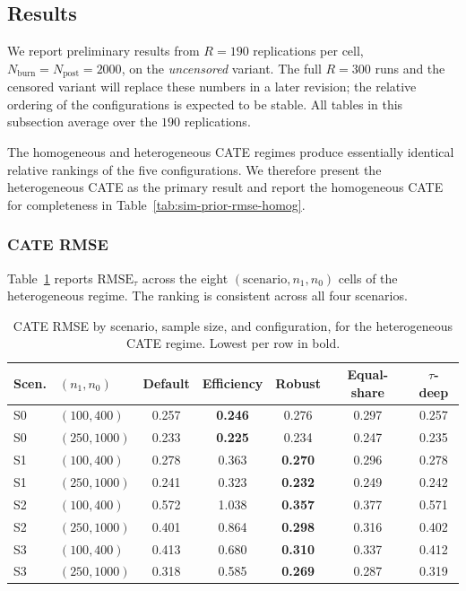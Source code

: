 \documentclass[11pt]{article}
\theoremstyle{plain}
\theoremstyle{definition}
\theoremstyle{remark}
\newcommand{\1}{\mathds{1}}
\begin{document}
\subsection{Results}
\label{sec:sim-prior-results}

We report preliminary results from $R = 190$ replications per cell,
$N_{\mathrm{burn}} = N_{\mathrm{post}} = 2000$, on the \emph{uncensored}
variant. The full $R = 300$ runs and the censored variant will replace
these numbers in a later revision; the relative ordering of the
configurations is expected to be stable. All tables in this subsection
average over the $190$ replications.

The homogeneous and heterogeneous CATE regimes produce essentially
identical relative rankings of the five configurations. We therefore
present the heterogeneous CATE as the primary result and report the
homogeneous CATE for completeness in
Table~\ref{tab:sim-prior-rmse-homog}.

\subsubsection*{CATE RMSE}

Table~\ref{tab:sim-prior-rmse-het} reports $\mathrm{RMSE}_\tau$ across the
eight $(\text{scenario}, n_1, n_0)$ cells of the heterogeneous regime. The
ranking is consistent across all four scenarios.

\begin{table}[tb]
\centering
\small
\caption{CATE RMSE by scenario, sample size, and configuration, for the
heterogeneous CATE regime. Lowest per row in bold.}
\label{tab:sim-prior-rmse-het}
\begin{tabular}{llccccc}
\toprule
Scen. & $(n_1, n_0)$  & Default & Efficiency      & Robust          & Equal-share     & $\tau$-deep \\
\midrule
S0    & $(100, 400)$  & 0.257   & \textbf{0.246}  & 0.276           & 0.297           & 0.257       \\
S0    & $(250, 1000)$ & 0.233   & \textbf{0.225}  & 0.234           & 0.247           & 0.235       \\
\midrule
S1    & $(100, 400)$  & 0.278   & 0.363           & \textbf{0.270}  & 0.296           & 0.278       \\
S1    & $(250, 1000)$ & 0.241   & 0.323           & \textbf{0.232}  & 0.249           & 0.242       \\
\midrule
S2    & $(100, 400)$  & 0.572   & 1.038           & \textbf{0.357}  & 0.377           & 0.571       \\
S2    & $(250, 1000)$ & 0.401   & 0.864           & \textbf{0.298}  & 0.316           & 0.402       \\
\midrule
S3    & $(100, 400)$  & 0.413   & 0.680           & \textbf{0.310}  & 0.337           & 0.412       \\
S3    & $(250, 1000)$ & 0.318   & 0.585           & \textbf{0.269}  & 0.287           & 0.319       \\
\bottomrule
\end{tabular}
\end{table}
\end{document}
